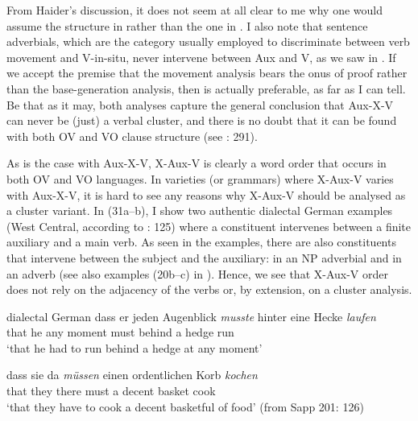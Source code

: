 \documentclass[output=paper, colorlinks, citecolor=brown]{langscibook}
\begin{document}
\settowidth{}
\ea
\label{ex:sangfelt:30}
 
 
\z 
\z

From Haider’s discussion, it does not seem at all clear to me why one would assume the structure in  rather than the one in . I also note that sentence adverbials, which are the category usually employed to discriminate between verb movement and V-in-situ, never intervene between Aux and V, as we saw in . If we accept the premise that the movement analysis bears the onus of proof rather than the base-generation analysis, then  is actually preferable, as far as I can tell. Be that as it may, both analyses capture the general conclusion that Aux-X-V can never be (just) a verbal cluster, and there is no doubt that it can be found with both OV and VO clause structure (see \citealt{Haider2010}: 291).


As is the case with Aux-X-V, X-Aux-V is clearly a word order that occurs in both OV and VO languages. In varieties (or grammars) where X-Aux-V varies with Aux-X-V, it is hard to see any reasons why X-Aux-V should be analysed as a cluster variant. In (31a–b), I show two authentic dialectal German examples (West Central, according to \citealt{Sapp2011}: 125) where a constituent intervenes between a finite auxiliary and a main verb. As seen in the examples, there are also constituents that intervene between the subject and the auxiliary: in  an NP adverbial and in  an adverb (see also examples (20b–c) in ). Hence, we see that X-Aux-V order does not rely on the adjacency of the verbs or, by extension, on a cluster analysis.



\ea dialectal German
\label{ex:sangfelt:31}
\ea\label{ex:sangfelt:31a}
\gll dass er {jeden} {Augenblick} \textit{musste}  {hinter} {eine} {Hecke} \textit{laufen} \\
that he any moment must behind a hedge run\\
\glt ‘that he had to run behind a hedge at any moment’

\ex\label{ex:sangfelt:31b}
\gll dass sie {da} \textit{müssen} {einen} {ordentlichen} {Korb} \textit{kochen}\\
that they there must a decent basket cook\\
\glt ‘that they have to cook a decent basketful of food’ (from Sapp 201: 126)\\
\z 
\z 
\end{document}
